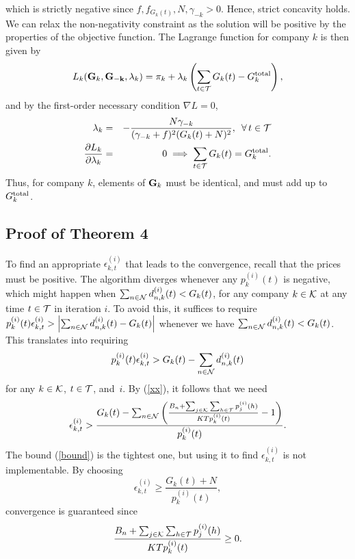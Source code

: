 which is strictly negative since $f, f_{G_k(t)} ,N,\gamma_{-k} >0$.
Hence, strict concavity holds. We can relax the non-negativity constraint as the solution will be positive by the properties of the objective function. The Lagrange function for company $k$ is then given by
\begin{equation}
L_{k}({\bf{G}}_k,{\bf{G_{-k}}},\lambda_k)= \pi_k + \lambda_k \left(\sum_{t\in {\cal T}}G_k(t)-G^{{\rm total}}_k\right),
\end{equation}
and by the first-order necessary condition $\nabla L=0$,
\begin{eqnarray}\lambda_k &=&-\frac{N\gamma_{-k}}{(\gamma_{-k}+f)^2(G_k(t)+N)^2},\,\,\,  \forall \,t\in {\cal T}\\
\frac{\partial L_k}{\partial \lambda_k} &=& 0 \implies \sum_{t\in {\cal T}}G_k(t)=G^{{\rm total}}_k.
\end{eqnarray}
Thus, for company $k$, elements of ${\bf G}_k$ must be identical, and must add up to $G^{{\rm total}}_k$.
\subsection{Proof of Theorem 4}
 To find an appropriate $\epsilon^{(i)}_{k,t}$ that leads to the convergence, recall that the prices must be positive. The algorithm diverges whenever any $p^{(i)}_k(t)$ is negative, which might happen when  $\sum_{n\in {\cal N}}d^{(i)}_{n,k}(t)<G_k(t)$, for any company $k\in{\cal K}$ at any time $t\in{\cal T}$ in iteration $i$. To avoid this, it suffices to require 
$ p^{(i)}_k(t)\epsilon^{(i)}_{k,t} > \left |  \sum_{n\in {\cal N}}d^{(i)}_{n,k}(t)-G_k(t)  \right |$  
whenever we have $\sum_{n\in {\cal N}}d^{(i)}_{n,k}(t)<G_k(t)$. This translates into requiring $$p^{(i)}_k(t)\epsilon^{(i)}_{k,t}> G_k(t)-\sum_{n\in {\cal N}}d^{(i)}_{n,k}(t) $$ for any $k\in{\cal K}$, $t\in{\cal T}$, and~$i$. By (\ref{xx}), it follows that we need
\begin{equation}
\epsilon^{(i)}_{k,t}
>\frac{G_k(t)-\sum_{n\in {\cal N}}\left(\frac{B_n+\sum_{j\in {\cal K}}\sum_{h\in {\cal T}}p^{(i)}_j(h)}{KTp^{(i)}_k(t)}-1\right)}{p^{(i)}_k(t)}.
\label{bound}\end{equation}
The bound (\ref{bound}) is the tightest one, but using it to find $\epsilon^{(i)}_{k,t}$ is not implementable. By choosing 
 \begin{equation}\epsilon^{(i)}_{k,t} \geq \frac{G_k(t)+N}{p^{(i)}_k(t)},\label{eps}\end{equation}
 convergence is guaranteed since $$\frac{B_n+\sum_{j\in {\cal K}}\sum_{h\in {\cal T}}p^{(i)}_j(h)}{KTp^{(i)}_k(t)}\geq0.$$

